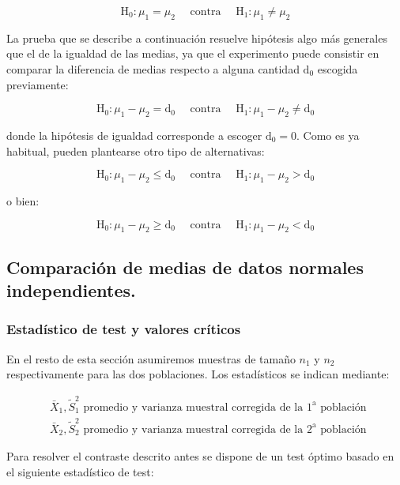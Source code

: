 \documentclass[
]{article}
\begin{document}
\[
\mathrm{H}_{0}: \mu_{1}=\mu_{2} \quad \text { contra } \quad \mathrm{H}_{1}: \mu_{1} \neq \mu_{2}
\]

La prueba que se describe a continuación resuelve hipótesis algo más generales que el de la igualdad de las medias, ya que el experimento puede consistir en comparar la diferencia de medias respecto a alguna cantidad \(\mathrm{d}_{0}\) escogida previamente:

\[
\mathrm{H}_{0}: \mu_{1}-\mu_{2}=\mathrm{d}_{0} \quad \text { contra } \quad \mathrm{H}_{1}: \mu_{1}-\mu_{2} \neq \mathrm{d}_{0}
\]

donde la hipótesis de igualdad corresponde a escoger \(\mathrm{d}_{0}=0\). Como es ya habitual, pueden plantearse otro tipo de alternativas:

\[
\mathrm{H}_{0}: \mu_{1}-\mu_{2} \leq \mathrm{d}_{0} \quad \text { contra } \quad \mathrm{H}_{1}: \mu_{1}-\mu_{2}>\mathrm{d}_{0}
\]

o bien:

\[
\mathrm{H}_{0}: \mu_{1}-\mu_{2} \geq \mathrm{d}_{0} \quad \text { contra } \quad \mathrm{H}_{1}: \mu_{1}-\mu_{2}<\mathrm{d}_{0}
\]

\subsection{Comparación de medias de datos normales independientes.}\label{comparaciuxf3n-de-medias-de-datos-normales-independientes.}

\subsubsection{Estadístico de test y valores críticos}\label{estaduxedstico-de-test-y-valores-cruxedticos}

En el resto de esta sección asumiremos muestras de tamaño \(n_{1}\) y \(n_{2}\) respectivamente para las dos poblaciones. Los estadísticos se indican mediante:

\[
\begin{aligned}
& \bar{X}_{1}, \widetilde{S}_{1}^{2} \text { promedio y varianza muestral corregida de la } 1^{\mathrm{a}} \text { población } \\
& \bar{X}_{2}, \widetilde{S}_{2}^{2} \text { promedio y varianza muestral corregida de la } 2^{\mathrm{a}} \text { población }
\end{aligned}
\]

Para resolver el contraste descrito antes se dispone de un test óptimo basado en el siguiente estadístico de test:
\end{document}
